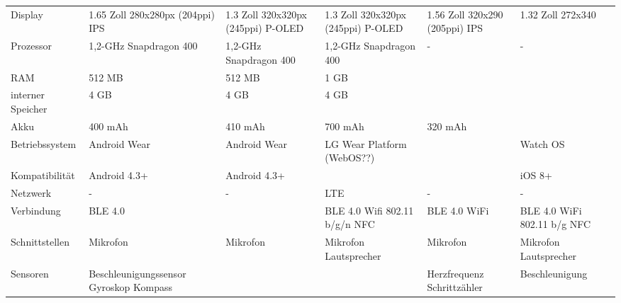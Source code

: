 \begin{landscape}
\begin{longtable}{p{3cm}p{4cm}p{4cm}p{4cm}p{4cm}p{4cm}}
	Display
		& 1.65 Zoll \newline
			280x280px (204ppi) \newline
			IPS
		& 1.3 Zoll \newline
			320x320px (245ppi) \newline
			P-OLED
		& 1.3 Zoll \newline
			320x320px (245ppi) \newline
			P-OLED
		& 1.56 Zoll \newline
			320x290 (205ppi) \newline
			IPS
		& 1.32 Zoll \newline
			272x340 \\
	Prozessor
		& 1,2-GHz \newline Snapdragon 400
		& 1,2-GHz \newline Snapdragon 400
		& 1,2-GHz \newline Snapdragon 400
		& -
		& - \\
	RAM
		& 512 MB
		& 512 MB
		& 1 GB
		& 
		& \\
	interner Speicher
		& 4 GB
		& 4 GB
		& 4 GB
		& 
		& \\
	Akku
		& 400 mAh
		& 410 mAh
		& 700 mAh
		& 320 mAh
		& \\
	Betriebssystem
		& Android Wear
		& Android Wear
		& LG Wear Platform (WebOS??)
		& 
		& Watch OS \\
	Kompatibilität
		& Android 4.3+
		& Android 4.3+
		&
		&
		& iOS 8+\\
	Netzwerk
		& -
		& -
		& LTE
		& - 
		& -\\
	Verbindung
		& BLE 4.0
		&
		& BLE 4.0 \newline
			Wifi 802.11 b/g/n \newline
			NFC
		& BLE 4.0 \newline
			WiFi
		& BLE 4.0 \newline
			WiFi 802.11 b/g \newline
			NFC \\
	Schnittstellen
		& Mikrofon
		& Mikrofon
		& Mikrofon \newline
			Lautsprecher
		& Mikrofon
		& Mikrofon \newline
			Lautsprecher \\
	Sensoren
		& Beschleunigungssensor \newline
			Gyroskop \newline
			Kompass
		& 
		& 
		& Herzfrequenz \newline
			Schrittzähler
		& Beschleunigung \newline

\end{longtable}
\end{landscape}
